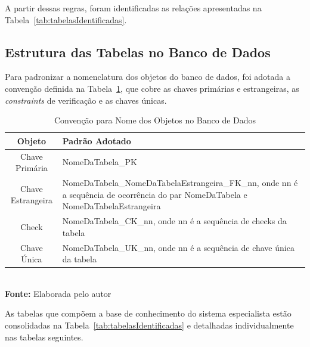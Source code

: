 A partir dessas regras, foram identificadas as relações apresentadas na Tabela~\ref{tab:tabelasIdentificadas}.

\subsection{Estrutura das Tabelas no Banco de Dados}
\label{sub:estruturaTabelas}
Para padronizar a nomenclatura dos objetos do banco de dados, foi adotada a convenção definida na Tabela~\ref{tab:convencaoObjBD}, que cobre as chaves primárias e estrangeiras, as \textit{constraints} de verificação e as chaves únicas.

\FloatBarrier
\begin{table}[!htbp]
  \centering
  \caption{Convenção para Nome dos Objetos no Banco de Dados}
  \begin{tabular}{ c | p{11.5cm} }
    \hline
    \textbf{Objeto}   & \textbf{Padrão Adotado}                                                                                                          \\ \hline
    Chave Primária    & NomeDaTabela\_PK                                                                                                                 \\ \hline
    Chave Estrangeira & NomeDaTabela\_NomeDaTabelaEstrangeira\_FK\_nn, onde nn é a sequência de ocorrência do par NomeDaTabela e NomeDaTabelaEstrangeira \\ \hline
    Check             & NomeDaTabela\_CK\_nn, onde nn é a sequência de checks da tabela                                                                  \\ \hline
    Chave Única       & NomeDaTabela\_UK\_nn, onde nn é a sequência de chave única da tabela                                                             \\ \hline
  \end{tabular}
  \\ \vspace{0.2cm}
  \textbf{Fonte:} Elaborada pelo autor
  \label{tab:convencaoObjBD}
\end{table}
\FloatBarrier

As tabelas que compõem a base de conhecimento do sistema especialista estão consolidadas na Tabela~\ref{tab:tabelasIdentificadas} e detalhadas individualmente nas tabelas seguintes.

